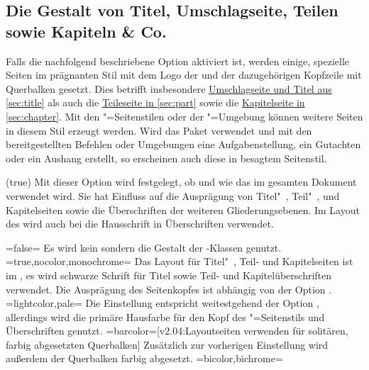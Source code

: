 \begin{DeclareEntity*}{}
\begin{DeclareEntity*}{}
\begin{DeclareEntity*}{}
\subsection{%
  Die Gestalt von Titel, Umschlagseite, Teilen sowie Kapiteln \& Co.%
}
%
Falls die nachfolgend beschriebene Option  aktiviert ist, 
werden einige, spezielle Seiten im prägnanten Stil mit dem Logo der \TnUD und 
der dazugehörigen Kopfzeile mit Querbalken gesetzt. Dies betrifft insbesondere 
\hyperref[sec:title]{Umschlagseite und Titel aus \autoref*{sec:title}} als auch 
die \hyperref[sec:part]{Teileseite in \autoref*{sec:part}} sowie die 
\hyperref[sec:chapter]{Kapitelseite in \autoref*{sec:chapter}}. Mit den 
"=Seitenstilen oder der "=Umgebung 
können weitere Seiten in diesem Stil erzeugt werden. Wird das Paket 
 verwendet und mit den bereitgestellten Befehlen oder 
Umgebungen eine Aufgabenstellung, ein Gutachten oder ein Aushang erstellt, so 
erscheinen auch diese in besagtem Seitenstil.
%
\begin{Declaration}
  {}
  (true)
%
Mit dieser Option wird festgelegt, ob und wie das \TUDCD im gesamten Dokument 
verwendet wird. Sie hat Einfluss auf die Ausprägung von Titel"~, Teil"~, und 
Kapitelseiten sowie die Überschriften der weiteren Gliederungsebenen. 
Im Layout des \CDs wird auch bei  die Hausschrift in 
Überschriften verwendet.
\begin{DeclareValues}
\itemval=false=
  Es wird kein \CD sondern die Gestalt der \KOMAScript-Klassen genutzt.
\itemval*=true,nocolor,monochrome=
  Das Layout für Titel"~, Teil- und Kapitelseiten ist im \CD, es wird 
  schwarze Schrift für Titel sowie Teil- und Kapitelüberschriften verwendet.
  Die Ausprägung des Seitenkopfes ist abhängig von der Option .
\itemval=lightcolor,pale=
  Die Einstellung entspricht weitestgehend der Option , 
  allerdings wird die primäre Hausfarbe  für den Kopf des 
  "=Seitenstils und Überschriften genutzt.
\itemval=barcolor=[v2.04:Layoutseiten verwenden für  
    solitären, farbig abgesetzten Querbalken]
  Zusätzlich zur vorherigen Einstellung wird außerdem der Querbalken farbig 
  abgesetzt.
\itemval=bicolor,bichrome=%

\end{DeclareValues}
\end{Declaration}
\end{DeclareEntity*}
\end{DeclareEntity*}
\end{DeclareEntity*}
